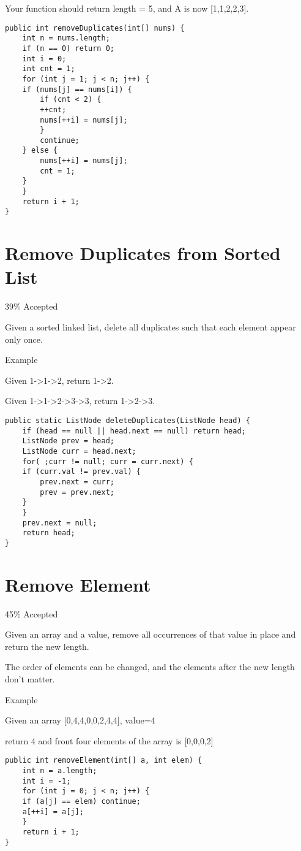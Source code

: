 \documentclass[12pt]{book}
\begin{document}
Your function should return length = 5, and A is now [1,1,2,2,3].
\lstset{language=java,label= ,caption= ,numbers=none}
\begin{lstlisting}
public int removeDuplicates(int[] nums) {
    int n = nums.length;
    if (n == 0) return 0;
    int i = 0;
    int cnt = 1;
    for (int j = 1; j < n; j++) {
	if (nums[j] == nums[i]) {
	    if (cnt < 2) {
		++cnt;
		nums[++i] = nums[j];
	    } 
	    continue;   
	} else {
	    nums[++i] = nums[j];
	    cnt = 1;
	}
    }
    return i + 1;
}
\end{lstlisting}
\chapter{Remove Duplicates from Sorted List}
\label{sec-54}

39\% Accepted

Given a sorted linked list, delete all duplicates such that each element appear only once.

Example

Given 1->1->2, return 1->2.

Given 1->1->2->3->3, return 1->2->3.
\lstset{language=java,label= ,caption= ,numbers=none}
\begin{lstlisting}
public static ListNode deleteDuplicates(ListNode head) {
    if (head == null || head.next == null) return head;
    ListNode prev = head;
    ListNode curr = head.next;
    for( ;curr != null; curr = curr.next) {
	if (curr.val != prev.val) {
	    prev.next = curr;
	    prev = prev.next;
	} 
    }
    prev.next = null;
    return head;
}
\end{lstlisting}
\chapter{Remove Element}
\label{sec-55}

45\% Accepted

Given an array and a value, remove all occurrences of that value in place and return the new length.

The order of elements can be changed, and the elements after the new length don't matter.

Example

Given an array [0,4,4,0,0,2,4,4], value=4

return 4 and front four elements of the array is [0,0,0,2]
\lstset{language=java,label= ,caption= ,numbers=none}
\begin{lstlisting}
public int removeElement(int[] a, int elem) {            
    int n = a.length;
    int i = -1;
    for (int j = 0; j < n; j++) {
	if (a[j] == elem) continue;
	a[++i] = a[j];
    }
    return i + 1;
}
\end{lstlisting}
\end{document}
